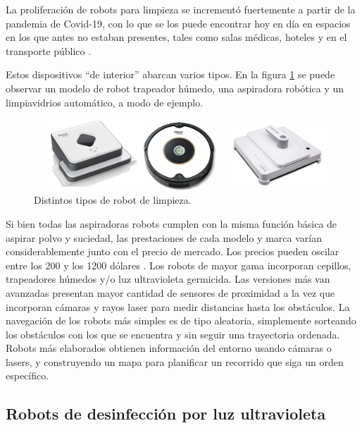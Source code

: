 La proliferación de robots para limpieza se incrementó fuertemente a partir de la pandemia de Covid-19, con lo que se los puede encontrar hoy en día en espacios en los que antes no estaban presentes, tales como salas médicas,  hoteles y en el transporte público \citep{Cleaning}. 

Estos dispositivos “de interior” abarcan varios tipos. En la  figura \ref{fig:robotslimpieza} se puede observar un modelo de robot trapeador húmedo, una aspiradora robótica y un limpiavidrios automático, a modo de ejemplo.

\begin{figure}[h]
	\centering
	\includegraphics[width=\textwidth]{./Figures/robotslimpieza.jpg}
	\caption{Distintos tipos de robot de limpieza\protect\footnotemark.}
	\label{fig:robotslimpieza}
\end{figure}

Si bien todas las aspiradoras robots cumplen con la misma función básica de aspirar polvo y suciedad, las prestaciones de cada modelo y marca varían considerablemente junto con el precio de mercado. Los precios pueden oscilar entre los 200 y los 1200 dólares \citep{roomba}.
Los robots de mayor gama incorporan cepillos, trapeadores húmedos y/o luz ultravioleta germicida. Las versiones más van avanzadas  presentan mayor cantidad de sensores de proximidad a la vez que incorporan cámaras y rayos laser para medir distancias hasta los obstáculos.  
La navegación de los robots más simples es de tipo aleatoria, simplemente  sorteando los obstáculos con los que se encuentra y sin seguir una trayectoria ordenada. 
Robots más elaborados obtienen información del entorno usando cámaras o lasers, y construyendo un  mapa para planificar un recorrido que siga un orden específico. 



\subsection{Robots de desinfección por luz ultravioleta}

